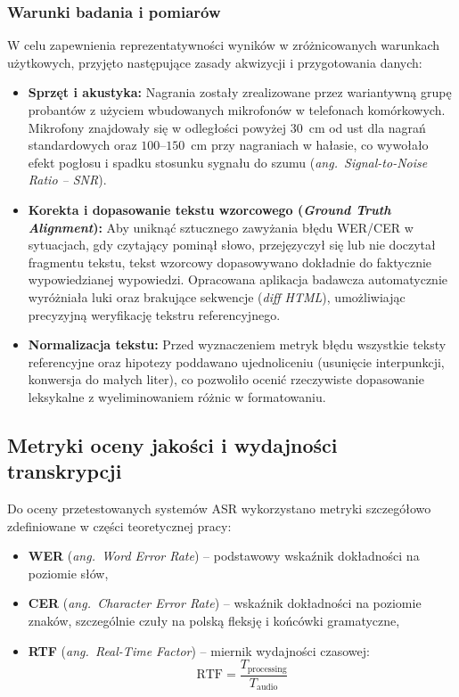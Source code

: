 \subsubsection{Warunki badania i pomiarów}
\label{subsubsec:test_conditions}

W celu zapewnienia reprezentatywności wyników w zróżnicowanych warunkach użytkowych, przyjęto następujące zasady akwizycji i przygotowania danych:

\begin{itemize}
    \item \textbf{Sprzęt i akustyka:} Nagrania zostały zrealizowane przez wariantywną grupę probantów z użyciem wbudowanych mikrofonów w telefonach komórkowych. Mikrofony znajdowały się w odległości powyżej $30$~cm od ust dla nagrań standardowych oraz $100$--$150$~cm przy nagraniach w hałasie, co wywołało efekt pogłosu i spadku stosunku sygnału do szumu (\textit{ang.~Signal-to-Noise Ratio -- SNR}).
    \item \textbf{Korekta i dopasowanie tekstu wzorcowego (\textit{Ground Truth Alignment}):} Aby uniknąć sztucznego zawyżania błędu WER/CER w sytuacjach, gdy czytający pominął słowo, przejęzyczył się lub nie doczytał fragmentu tekstu, tekst wzorcowy dopasowywano dokładnie do faktycznie wypowiedzianej wypowiedzi. Opracowana aplikacja badawcza automatycznie wyróżniała luki oraz brakujące sekwencje (\textit{diff HTML}), umożliwiając precyzyjną weryfikację tekstru referencyjnego.
    \item \textbf{Normalizacja tekstu:} Przed wyznaczeniem metryk błędu wszystkie teksty referencyjne oraz hipotezy poddawano ujednoliceniu (usunięcie interpunkcji, konwersja do małych liter), co pozwoliło ocenić rzeczywiste dopasowanie leksykalne z wyeliminowaniem różnic w formatowaniu.
\end{itemize}

\subsection{Metryki oceny jakości i wydajności transkrypcji}
\label{subsec:evaluation_metrics}

Do oceny przetestowanych systemów ASR wykorzystano metryki szczegółowo zdefiniowane w części teoretycznej pracy:
\begin{itemize}
    \item \textbf{WER} (\textit{ang.~Word Error Rate}) -- podstawowy wskaźnik dokładności na poziomie słów,
    \item \textbf{CER} (\textit{ang.~Character Error Rate}) -- wskaźnik dokładności na poziomie znaków, szczególnie czuły na polską fleksję i końcówki gramatyczne,
    \item \textbf{RTF} (\textit{ang.~Real-Time Factor}) -- miernik wydajności czasowej:
    \begin{equation}
    \text{RTF} = \frac{T_{\text{processing}}}{T_{\text{audio}}}
    \end{equation}
\end{itemize}

